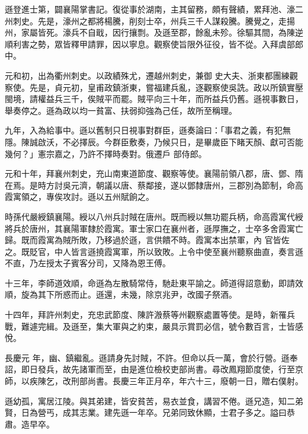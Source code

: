 \begin{pinyinscope}
 遜登進士第，闢襄陽掌書記。復從事於湖南，主其留務，頗有聲績，累拜池、濠二州刺史。先是，濠州之都將楊騰，削刻士卒，州兵三千人謀殺騰。騰覺之，走揚州，家屬皆死。濠兵不自戢，因行攘剽。及遜至郡，餘亂未殄。徐驅其間，為陳逆順利害之勢，眾皆釋甲請罪，因以寧息。觀察使旨限外征役，皆不從。入拜虞部郎中。



 元和初，出為衢州刺史。以政績殊尤，遷越州刺史，兼御
 史大夫、浙東都團練觀察使。先是，貞元初，皇甫政鎮浙東，嘗福建兵亂，逐觀察使吳詵。政以所鎮實壓閩境，請權益兵三千，俟賊平而罷。賊平向三十年，而所益兵仍舊。遜視事數日，舉奏停之。遜為政以均一貧富、扶弱抑強為己任，故所至稱理。



 九年，入為給事中。遜以舊制只日視事對群臣，遜奏論曰：「事君之義，有犯無隱。陳誠啟沃，不必擇辰。今群臣敷奏，乃候只日，是畢歲臣下睹天顏、獻可否能幾何？」憲宗嘉之，乃許不擇時奏對。俄遷戶
 部侍郎。



 元和十年，拜襄州刺史，充山南東道節度、觀察等使。襄陽前領八郡，唐、鄧、隋在焉。是時方討吳元濟，朝議以唐、蔡鄰接，遂以鄧隸唐州，三郡別為節制，命高霞寓領之，專俟攻討。遜以五州賦餉之。



 時孫代嚴綬鎮襄陽。綬以八州兵討賊在唐州。既而綬以無功罷兵柄，命高霞寓代綬將兵於唐州，其襄陽軍隸於霞寓。軍士家口在襄州者，遜厚撫之，士卒多舍霞寓亡歸。既而霞寓為賊所敗，乃移過於遜，言供饋不時。霞寓本出禁軍，內
 官皆佐之。既貶官，中人皆言遜撓霞寓軍，所以致敗。上令中使至襄州聽察曲直，奏言遜不直，乃左授太子賓客分司，又降為恩王傅。



 十三年，李師道效順，命遜為左散騎常侍，馳赴東平諭之。師道得詔意動，即請效順，旋為其下所惑而止。遜還，未幾，除京兆尹，改國子祭酒。



 十四年，拜許州刺史，充忠武節度、陳許溵蔡等州觀察處置等使。是時，新罹兵戰，難遽完緝。及遜至，集大軍與之約束，嚴具示賞罰必信，號令數百言，士皆感悅。



 長慶元
 年，幽、鎮繼亂。遜請身先討賊，不許。但命以兵一萬，會於行營。遜奉詔，即日發兵，故先諸軍而至，由是進位檢校吏部尚書。尋改鳳翔節度使，行至京師，以疾陳乞，改刑部尚書。長慶三年正月卒，年六十三，廢朝一日，贈右僕射。



 遜幼孤，寓居江陵。與其弟建，皆安貧苦，易衣並食，講習不倦。遜兄造，知二弟賢，日為營丐，成其志業。建先遜一年卒。兄弟同致休顯，士君子多之。謚曰恭肅。造早卒。




\end{pinyinscope}
